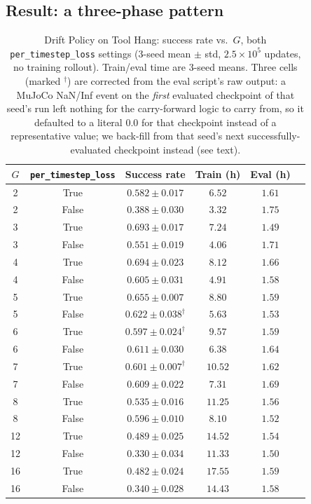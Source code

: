 \documentclass[11pt]{article}
\begin{document}
\subsection{Result: a three-phase pattern}
\label{sec:three_phase}

\begin{table}[H]
\centering
\caption{Drift Policy on Tool Hang: success rate vs.\ $G$, both \texttt{per\_timestep\_loss} settings (3-seed mean $\pm$ std, $2.5\times10^5$ updates, no training rollout). Train/eval time are 3-seed means. Three cells (marked $^\dagger$) are corrected from the eval script's raw output: a MuJoCo NaN/Inf event on the \emph{first} evaluated checkpoint of that seed's run left nothing for the carry-forward logic to carry from, so it defaulted to a literal $0.0$ for that checkpoint instead of a representative value; we back-fill from that seed's next successfully-evaluated checkpoint instead (see text).}
\label{tab:drift_3seed}
\begin{tabular}{cccccc}
\toprule
$G$ & \texttt{per\_timestep\_loss} & Success rate & Train (h) & Eval (h) \\
\midrule
2  & True  & $0.582 \pm 0.017$ & $6.52$  & $1.61$ \\
2  & False & $0.388 \pm 0.030$ & $3.32$  & $1.75$ \\
3  & True  & $\mathbf{0.693 \pm 0.017}$ & $7.24$  & $1.49$ \\
3  & False & $0.551 \pm 0.019$ & $4.06$  & $1.71$ \\
4  & True  & $\mathbf{0.694 \pm 0.023}$ & $8.12$  & $1.66$ \\
4  & False & $0.605 \pm 0.031$ & $4.91$  & $1.58$ \\
5  & True  & $0.655 \pm 0.007$ & $8.80$  & $1.59$ \\
5  & False & $0.622 \pm 0.038^\dagger$ & $5.63$  & $1.53$ \\
6  & True  & $0.597 \pm 0.024^\dagger$ & $9.57$  & $1.59$ \\
6  & False & $0.611 \pm 0.030$ & $6.38$  & $1.64$ \\
7  & True  & $0.601 \pm 0.007^\dagger$ & $10.52$ & $1.62$ \\
7  & False & $0.609 \pm 0.022$ & $7.31$  & $1.69$ \\
8  & True  & $0.535 \pm 0.016$ & $11.25$ & $1.56$ \\
8  & False & $0.596 \pm 0.010$ & $8.10$  & $1.52$ \\
12 & True  & $\mathbf{0.489 \pm 0.025}$ & $14.52$ & $1.54$ \\
12 & False & $0.330 \pm 0.034$ & $11.33$ & $1.50$ \\
16 & True  & $\mathbf{0.482 \pm 0.024}$ & $17.55$ & $1.59$ \\
16 & False & $0.340 \pm 0.028$ & $14.43$ & $1.58$ \\
\bottomrule
\end{tabular}
\end{table}
\end{document}
